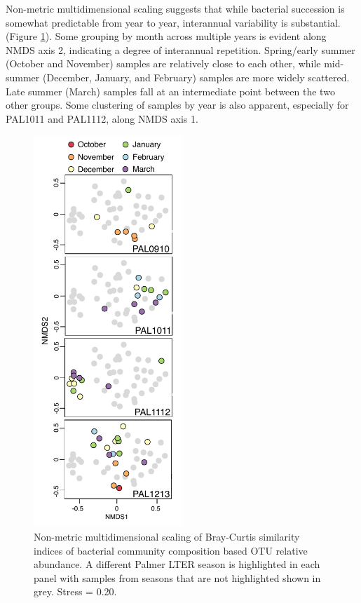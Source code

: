 Non-metric multidimensional scaling suggests that while bacterial succession is somewhat predictable from year to year, interannual variability is substantial. (Figure \ref{fig:ch4:nmds}). Some grouping by month across multiple years is evident along NMDS axis 2, indicating a degree of interannual repetition. Spring/early summer (October and November) samples are relatively close to each other, while mid-summer (December, January, and February) samples are more widely scattered. Late summer (March) samples fall at an intermediate point between the two other groups. Some clustering of samples by year is also apparent, especially for PAL1011 and PAL1112, along NMDS axis 1. 

\begin{figure}[htbp] 
\centering 
\includegraphics[width=0.5\textwidth]{Chapter_5_LTER/Figures/Figure_8_NMDS}
\caption[Non-metric multidimensional scaling of Bray-Curtis similarity indices based OTU relative abundance.]{Non-metric multidimensional scaling of Bray-Curtis similarity indices of bacterial community composition based OTU relative abundance. A different Palmer LTER season is highlighted in each panel with samples from seasons that are not highlighted shown in grey. Stress = 0.20.} 
\label{fig:ch4:nmds} 
\end{figure}


